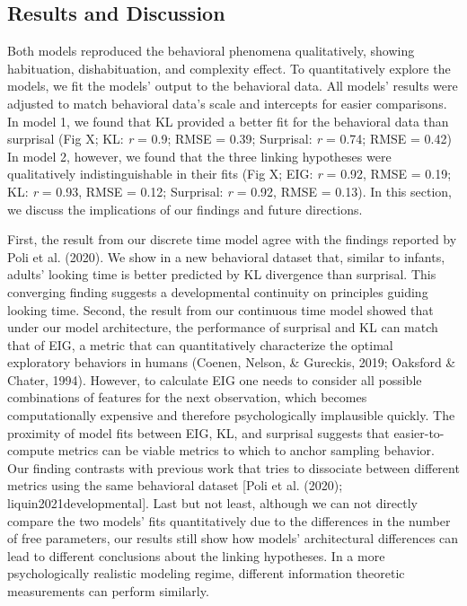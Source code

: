 \documentclass[10pt, letterpaper]{article}
\begin{document}
\hypertarget{results-and-discussion}{%
\subsection{Results and Discussion}\label{results-and-discussion}}

Both models reproduced the behavioral phenomena qualitatively, showing
habituation, dishabituation, and complexity effect. To quantitatively
explore the models, we fit the models' output to the behavioral data.
All models' results were adjusted to match behavioral data's scale and
intercepts for easier comparisons. In model 1, we found that KL provided
a better fit for the behavioral data than surprisal (Fig X; KL: \emph{r}
= 0.9; RMSE = 0.39; Surprisal: \emph{r} = 0.74; RMSE = 0.42) In model 2,
however, we found that the three linking hypotheses were qualitatively
indistinguishable in their fits (Fig X; EIG: \emph{r} = 0.92, RMSE =
0.19; KL: \emph{r} = 0.93, RMSE = 0.12; Surprisal: \emph{r} = 0.92, RMSE
= 0.13). In this section, we discuss the implications of our findings
and future directions.

First, the result from our discrete time model agree with the findings
reported by Poli et al. (2020). We show in a new behavioral dataset
that, similar to infants, adults' looking time is better predicted by KL
divergence than surprisal. This converging finding suggests a
developmental continuity on principles guiding looking time. Second, the
result from our continuous time model showed that under our model
architecture, the performance of surprisal and KL can match that of EIG,
a metric that can quantitatively characterize the optimal exploratory
behaviors in humans (Coenen, Nelson, \& Gureckis, 2019; Oaksford \&
Chater, 1994). However, to calculate EIG one needs to consider all
possible combinations of features for the next observation, which
becomes computationally expensive and therefore psychologically
implausible quickly. The proximity of model fits between EIG, KL, and
surprisal suggests that easier-to-compute metrics can be viable metrics
to which to anchor sampling behavior. Our finding contrasts with
previous work that tries to dissociate between different metrics using
the same behavioral dataset {[}Poli et al. (2020);
liquin2021developmental{]}. Last but not least, although we can not
directly compare the two models' fits quantitatively due to the
differences in the number of free parameters, our results still show how
models' architectural differences can lead to different conclusions
about the linking hypotheses. In a more psychologically realistic
modeling regime, different information theoretic measurements can
perform similarly.
\end{document}
